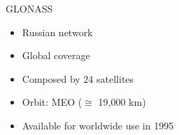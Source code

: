 \begin{frame}{GLONASS}

    \begin{itemize}
        \item Russian network
        \vspace{0.2cm}
        \item Global coverage
        \vspace{0.2cm}
        \item Composed by 24 satellites
        \vspace{0.2cm}
        \item Orbit: MEO ($\cong$ 19,000 km)
        \vspace{0.2cm}
        \item Available for worldwide use in 1995
    \end{itemize}

\end{frame}


